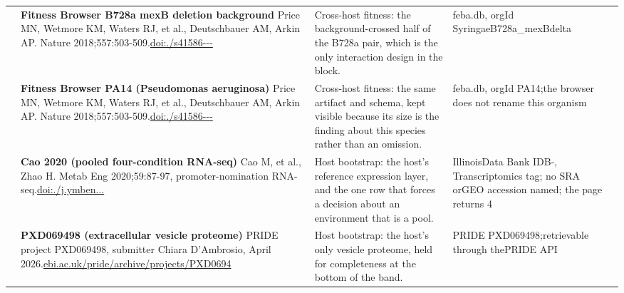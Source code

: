 \begin{landscape}
\begin{longtable}{@{}r@{\hspace{4pt}} L{78mm} L{72mm} L{76mm}@{}}
 & \textbf{Fitness Browser B728a mexB deletion background} \newline Price MN, Wetmore KM, Waters RJ, et al., Deutschbauer AM, Arkin AP. Nature 2018;557:503-509.\newline \href{https://doi.org/10.1038/s41586-018-0124-0}{doi:./\allowbreak s41586---} & Cross-host fitness: the background-crossed half of the B728a pair, which is the only interaction design in the block. & feba.\allowbreak db, org\allowbreak Id Syrin\allowbreak gaeB728a\_\allowbreak mexBdel\allowbreak ta \\
 & \textbf{Fitness Browser PA14 (Pseudomonas aeruginosa)} \newline Price MN, Wetmore KM, Waters RJ, et al., Deutschbauer AM, Arkin AP. Nature 2018;557:503-509.\newline \href{https://doi.org/10.1038/s41586-018-0124-0}{doi:./\allowbreak s41586---} & Cross-host fitness: the same artifact and schema, kept visible because its size is the finding about this species rather than an omission. & feba.\allowbreak db, org\allowbreak Id PA14;\allowbreak  the bro\allowbreak wser doe\allowbreak s not re\allowbreak name thi\allowbreak s organi\allowbreak sm \\
 & \textbf{Cao 2020 (pooled four-condition RNA-seq)} \newline Cao M, et al., Zhao H. Metab Eng 2020;59:87-97, promoter-nomination RNA-seq.\newline \href{https://doi.org/10.1016/j.ymben.2020.01.005}{doi:./\allowbreak j.\allowbreak ymben...} & Host bootstrap: the host's reference expression layer, and the one row that forces a decision about an environment that is a pool. & Illinois\allowbreak  Data Ba\allowbreak nk IDB-\allowbreak , Transc\allowbreak riptomic\allowbreak s tag; n\allowbreak o SRA or\allowbreak  GEO acc\allowbreak ession n\allowbreak amed; th\allowbreak e page r\allowbreak eturns 4 \\
 & \textbf{PXD069498 (extracellular vesicle proteome)} \newline PRIDE project PXD069498, submitter Chiara D'Ambrosio, April 2026.\newline \href{https://www.ebi.ac.uk/pride/archive/projects/PXD069498}{ebi.\allowbreak ac.\allowbreak uk/\allowbreak pride/\allowbreak archive\allowbreak /\allowbreak project\allowbreak s/\allowbreak PXD0694} & Host bootstrap: the host's only vesicle proteome, held for completeness at the bottom of the band. & PRIDE PX\allowbreak D069498;\allowbreak  retriev\allowbreak able thr\allowbreak ough the\allowbreak  PRIDE A\allowbreak PI \\

\end{longtable}
\end{landscape}
